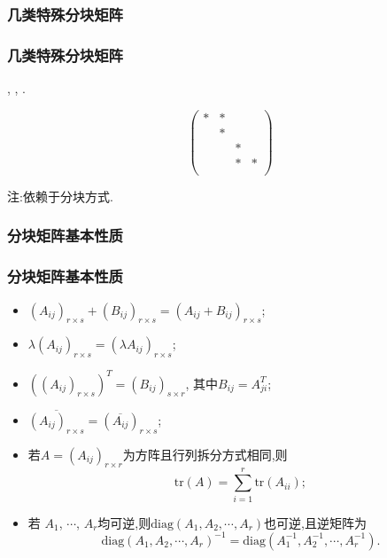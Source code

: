 \subsubsection{几类特殊分块矩阵}
\begin{frame}\frametitle{几类特殊分块矩阵}
, , .

\begin{equation*}
\left(\begin{array}{cccc}
*&*&&\\
&*&&\\
&&*&\\
&&*&*\\
\end{array}\right)
\end{equation*}

\pp
注:依赖于分块方式.
\end{frame}





\subsubsection{分块矩阵基本性质}
\begin{frame}\frametitle{分块矩阵基本性质}
\begin{lemma}[分块矩阵基本性质]
\begin{itemize}
\item $(A_{ij})_{r\times s}+(B_{ij})_{r\times s}=(A_{ij}+B_{ij})_{r\times s}$; \pp
\item $\lambda(A_{ij})_{r\times s}=(\lambda A_{ij})_{r\times s}$; \pp
\item $\left((A_{ij})_{r\times s}\right)^T = (B_{ij})_{s\times r}$, 其中$B_{ij}=A_{ji}^T$; \pp
\item $\overline{(A_{ij})_{r\times s}} = (\overline{A_{ij}})_{r\times s}$; \pp
\item 若$A=(A_{ij})_{r\times r}$为方阵且行列拆分方式相同,则
\[\mathrm{tr}(A)=\sum_{i=1}^r\mathrm{tr}(A_{ii});\] \pp
\item 若 $A_1$, $\cdots$, $A_r$均可逆,则$\mathrm{diag}(A_1,A_2,\cdots,A_r)$也可逆,且逆矩阵为
\[\mathrm{diag}(A_1,A_2,\cdots,A_r)^{-1}=\mathrm{diag}(A_1^{-1},A_2^{-1},\cdots,A_r^{-1}).\]
\end{itemize}
\end{lemma}
\end{frame}





